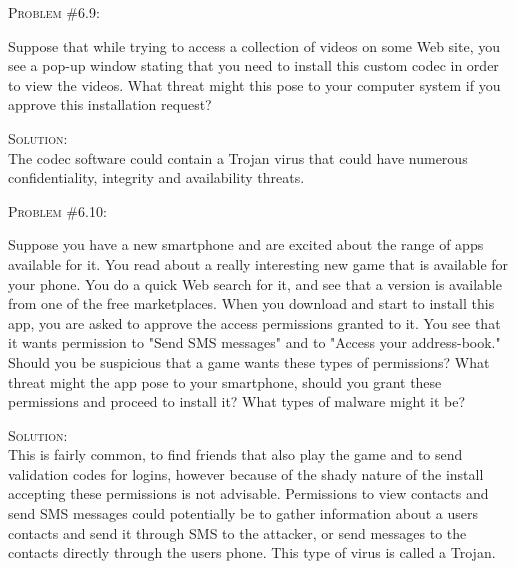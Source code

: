 \documentclass[12pt]{article}
\newenvironment{problem}[1]
{\begin{mdframed}[linewidth=0.8pt]
        \textsc{Problem #1:}

}
    {\end{mdframed}}
\newenvironment{solution}
    {\textsc{Solution:}\\}
    {\newpage}%
\begin{document}
	\begin{problem}{\#6.9}
		Suppose that while trying to access a collection of videos on some Web site, you see a pop-up window stating that you need to install this custom codec in order to view the videos. What threat might this pose to your computer system if you approve this installation request?
	\end{problem}
	\begin{solution}
		The codec software could contain a Trojan virus that could have numerous confidentiality, integrity and availability threats.
	\end{solution}
	\begin{problem}{\#6.10}
		Suppose you have a new smartphone and are excited about the range of apps available for it. You read about a really interesting new game that is available for your phone. You do a quick Web search for it, and see that a version is available from one of the free marketplaces. When you download and start to install this app, you are asked to approve the access permissions granted to it. You see that it wants permission to "Send SMS messages" and to "Access your address-book." Should you be suspicious that a game wants these types of permissions? What threat might the app pose to your smartphone, should you grant these permissions and proceed to install it? What types of malware might it be? 
	\end{problem}
	\begin{solution}
		This is fairly common, to find friends that also play the game and to send validation codes for logins, however because of the shady nature of the install accepting these permissions is not advisable. Permissions to view contacts and send SMS messages could potentially be to gather information about a users contacts and send it through SMS to the attacker, or send messages to the contacts directly through the users phone. This type of virus is called a Trojan. 
	\end{solution}
\end{document}
